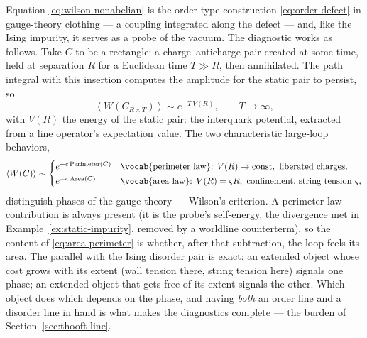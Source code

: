 Equation \eqref{eq:wilson-nonabelian} is the order-type construction
\eqref{eq:order-defect} in gauge-theory clothing --- a coupling
integrated along the defect --- and, like the Ising impurity, it serves
as a probe of the vacuum. The diagnostic works as follows. Take
$C$ to be a rectangle: a charge--anticharge pair created at some time,
held at separation $R$ for a Euclidean time $T \gg R$, then annihilated.
The path integral with this insertion computes the amplitude for the
static pair to persist, so
\begin{equation}
\left\langle W(C_{R \times T}) \right\rangle \sim e^{- T\, V(R)},
\qquad T \to \infty,
\label{eq:wilson-potential}
\end{equation}
with $V(R)$ the energy of the static pair: the interquark potential,
extracted from a line operator's expectation value. The two
characteristic large-loop behaviors,
\begin{equation}
\left\langle W(C) \right\rangle \sim
\begin{cases}
e^{-c\, \mathrm{Perimeter}(C)} & \text{\vocab{perimeter law}: } V(R) \to
\text{const}, \text{ liberated charges},\\[2pt]
e^{-\varsigma\, \mathrm{Area}(C)} & \text{\vocab{area law}: } V(R) =
\varsigma R, \text{ confinement, string tension } \varsigma,
\end{cases}
\label{eq:area-perimeter}
\end{equation}
distinguish phases of the gauge theory --- Wilson's criterion. A
perimeter-law contribution is always present (it is the probe's
self-energy, the divergence met in Example~\ref{ex:static-impurity},
removed by a worldline counterterm), so the content of
\eqref{eq:area-perimeter} is whether, after that subtraction, the loop
feels its area. The parallel with the Ising disorder pair is exact: an
extended object whose cost grows with its extent (wall tension there,
string tension here) signals one phase; an extended object that gets
free of its extent signals the other. Which object does which depends on
the phase, and having \emph{both} an order line and a disorder line in
hand is what makes the diagnostics complete --- the burden of
Section~\ref{sec:thooft-line}.

